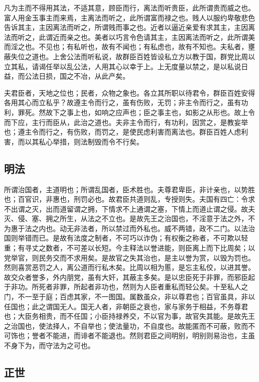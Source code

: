 \documentclass[]{article}
\begin{document}
凡为主而不得用其法，不适其意，顾臣而行，离法而听贵臣，此所谓贵而威之也。富人用金玉事主而来焉，主离法而听之，此所谓富而禄之也。贱人以服约卑敬悲色告诉其主，主因离法而听之，所谓贱而事之也。近者以逼近亲爱有求其主，主因离法而听之，此谓近而亲之也。美者以巧言令色请其主，主因离法而听之，此所谓美而淫之也。不见也；有私听也，故有不闻也；有私虑也，故有不知也。夫私者，壅蔽失位之道也。上舍公法而听私说，故群臣百姓皆设私立方以教于国，群党比周以立其私，请谒任举以乱公法，人用其心以幸于上。上无度量以禁之，是以私说日益，而公法日损，国之不冶，从此产矣。

夫君臣者，天地之位也；民者，众物之象也。各立其所职以待君令，群臣百姓安得各用其心而立私乎？故遵主令而行之，虽有伤败，无罚；非主令而行之，虽有功利，罪死。然故下之事上也，如响之应声也；臣之事主也，如影之从形也。故上令而下应，主行而臣从，此治之道也。夫非主令而行，有功利，因赏之，是教妄举也；遵主令而行之，有伤败，而罚之，是使民虑利害而离法也。群臣百姓人虑利害，而以其私心举措，则法制毁而令不行矣。

\hypertarget{header-n605}{%
\subsection{明法}\label{header-n605}}

所谓治国者，主道明也；所谓乱国者，臣术胜也。夫尊君卑臣，非计亲也，以势胜也；百官识，非惠也，刑罚必也。故君臣共道则乱，专授则失。夫国有四亡：令求不出谓之灭，出而道留谓之拥，下情求不上通谓之塞，下情上而道止谓之侵。故夫灭、侵、塞、拥之所生，从法之不立也。是故先王之治国也，不淫意于法之外，不为惠于法之内也。动无非法者，所以禁过而外私也。威不两错，政不二门。以法治国则举错而已。是故有法度之制者，不可巧以诈伪；有权衡之称者，不可欺以轻重；有寻丈之数者，不可差以长短。今主释法以誉进能，则臣离上而下比周矣；以党举官，则民务交而不求用矣。是故官之失其治也，是主以誉为赏，以毁为罚也。然则喜赏恶罚之人，离公道而行私木矣。比周以相为慝，是忘主私佼，以进其誉。故交众者誉多，外内朋党，虽有大奸，其蔽主多矣。是以忠臣死于非罪，而邪臣起于非功。所死者非罪，所起者非功也，然则为人臣者重私而轻公矣。十至私人之门，不一至于庭；百虑其家，不一图国。属数虽众，非以尊君也；百官虽具，非以任国也；此之谓国无人。国无人者，非朝臣之衰也，家与家务于相益，不务尊君也；大臣务相贵，而不任国；小臣持禄养交，不以官为事，故官失其能。是故先王之治国也，使法择人，不自举也；使法量功，不自度也。故能匿而不可蔽，败而不可饰也；誉者不能进，而诽者不能退也。然则君臣之间明别，明别则易治也，主虽不身下为，而守法为之可也。

\hypertarget{header-n609}{%
\subsection{正世}\label{header-n609}}
\end{document}
